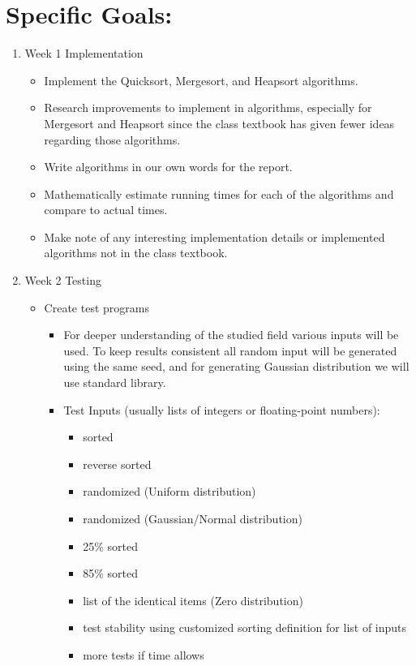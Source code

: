 \documentclass{article}
\begin{document}
\section*{Specific Goals:} 
\begin{enumerate}
\item Week 1  Implementation
\begin{itemize}
\item Implement the Quicksort, Mergesort, and Heapsort algorithms.
\item Research improvements to implement in algorithms, especially for Mergesort and Heapsort since the class textbook has given fewer ideas regarding those algorithms.
\item Write algorithms in our own words for the report.
\item Mathematically estimate running times for each of the algorithms and compare to actual times.
\item Make note of any interesting implementation details or implemented algorithms not in the class textbook.
\end{itemize}
\item Week 2  Testing 
\begin{itemize}
\item Create test programs
\begin{itemize}
\item For deeper understanding of the studied field various inputs will be used. To keep results consistent all random input will be generated using the same seed, and  for generating Gaussian distribution we will use standard library. 
\item Test Inputs (usually lists of integers or floating-point numbers): 
\begin{itemize} \label{350:testinputs}
\item sorted
\item reverse sorted
\item randomized (Uniform distribution)
\item randomized (Gaussian/Normal distribution)
\item 25\% sorted
\item 85\% sorted
\item list of the identical items (Zero distribution)
\item test stability using customized sorting definition for list of inputs
\item more tests if time allows
\end{itemize}
\end{itemize}

\end{itemize}
\end{enumerate}
\end{document}

